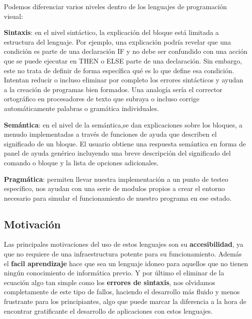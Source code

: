 Podemos diferenciar varios niveles dentro de los lenguajes de programación visual:

\textbf{Sintaxis}: en el nivel sintáctico, la explicación del bloque está limitada a
estructura del lenguaje. Por ejemplo, una explicación podría revelar que una condición es parte de una declaración IF y no debe ser confundido con una acción que se puede ejecutar en THEN o ELSE parte de una declaración. Sin embargo, este no trata de definir de forma específica qué es lo que define esa condición.
Intentan reducir o incluso eliminar por completo los errores sintácticos y ayudan a la creación de programas bien formados. Una analogía sería el corrector ortográfico en procesadores de texto que subraya o incluso corrige automáticamente palabras o gramática individuales.	

\textbf{Semántica}: en el nivel de la semántica,se dan explicaciones sobre los bloques, a menudo implementadas a través de funciones de ayuda que describen el significado
de un bloque. El usuario obtiene una respuesta semántica en forma de panel de ayuda genérico incluyendo una breve descripción del significado del comando o bloque y la lista de opciones adicionales.

\textbf{Pragmática}: permiten llevar nuestra implementación a un punto de testeo específico, nos ayudan con una serie de modulos propios a crear el entorno necesario para simular el funcionamiento de nuestro programa en ese estado.

\subsection{Motivación}
\label{subsec:motivacion}
Las principales motivaciones del uso de estos lenguajes son su \textbf{accesibilidad}, ya que no requiere de una infraestructura potente para su funcionamiento.
Además el \textbf{facil aprendizaje} hace que sea un lenguaje idoneo para aquellos que no tienen ningún conocimiento de informática previo.
Y por último el eliminar de la ecuación algo tan simple como los \textbf{errores de sintaxis}, nos olvidamos completamente de este tipo de fallos, haciendo el desarrollo más fluido y menos frustrante para los principiantes, algo que puede marcar la diferencia a la hora de encontrar gratificante el desarrollo de aplicaciones con estos lenguajes.

